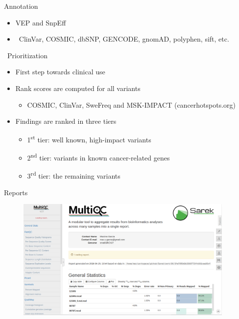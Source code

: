\documentclass[usepdftitle=false]{beamer}
\newcommand{\ts}{\textsuperscript}
\begin{document}


\begin{frame}{Annotation}
	\begin{itemize}
		\item VEP and SnpEff
		\pause
		\item \faDatabase\ ClinVar, COSMIC, dbSNP, GENCODE, gnomAD, polyphen, sift, etc.
	\end{itemize}
\end{frame}


\begin{frame}{\faWrench\ Prioritization}
	\begin{itemize}
		\item	First step towards clinical use
		\pause
		\item	Rank scores are computed for all variants
		\begin{itemize}
			\item	COSMIC, ClinVar, SweFreq and MSK-IMPACT (cancerhotspots.org)
		\end{itemize}
		\pause
		\item	Findings are ranked in three tiers
		\pause
		\begin{itemize}
			\item	1\ts{st} tier: well known, high-impact variants
			\item	2\ts{nd} tier: variants in known cancer-related genes
			\item	3\ts{rd} tier: the remaining variants
		\end{itemize}
	\end{itemize}
\end{frame}


\begin{frame}{Reports}
	\begin{figure}
		\includegraphics[height=6cm]{pictures/MultiQC_screenshot-2018-07-02.png}
	\end{figure}
\end{frame}
\end{document}
